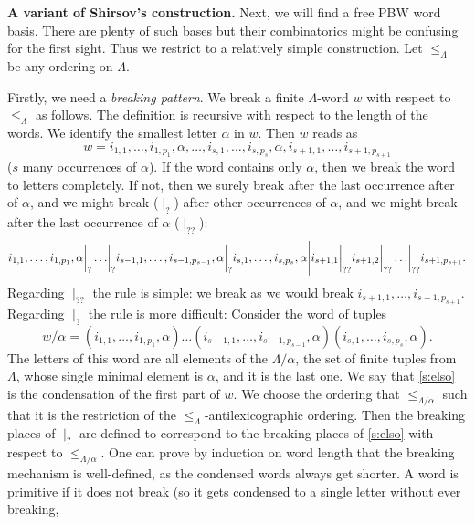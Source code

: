 \documentclass[11pt,a4paper]{amsart}
\newcommand{\plabel}[1]{ \label{#1}}
\newcommand{\plabel}[1]{ \label{#1}\rlap{\smash{${}^{^{[#1]}}$}}}
\newcommand{\plabel}[1]{ \label{#1}}
\theoremstyle{definition}
\theoremstyle{plain}
\begin{document}
\textbf{A variant of Shirsov's construction.}
Next, we will find a free PBW word basis.
There are plenty of such bases but their combinatorics might be confusing for the first sight.
Thus we restrict to a relatively simple construction.
Let $\leq_\Lambda$ be any ordering on $\Lambda$.

Firstly, we need a \textit{breaking pattern}.
We break a finite $\Lambda$-word $w$ with respect to $\leq_\Lambda$ as follows.
The definition is recursive with respect to the length of the words.
We identify the smallest letter $\alpha$ in $w$.
Then $w$ reads as
\begin{equation}
w=i_{1,1},\ldots, i_{1,p_1},\alpha,\ldots, i_{s,1},\ldots ,i_{s,p_s}, \alpha, i_{s+1,1},\ldots, i_{s+1,p_{s+1}}
\end{equation}
 ($s$ many occurrences of $\alpha$).
If the word contains only $\alpha$, then we break the word to letters completely.
If not, then we surely break after the last occurrence after of $\alpha$, and we might break ($\mid_{?}$)
 after other occurrences of $\alpha$, and we might break after the last occurrence of $\alpha$ ($\mid_{??}$):
\begin{equation}
 i_{1,1},\ldots, i_{1,p_1},\alpha\biggr|_?\ldots\biggr|_? i_{s-1,1},\ldots ,i_{s-1,p_{s-1}},
 \alpha\biggr|_?i_{s,1},\ldots ,i_{s,p_s}, \alpha\Biggr| i_{s+1,1}\biggr|_{??}i_{s+1,2}\biggr|_{??}\ldots \biggr|_{??}i_{s+1,p_{s+1}}.
 \notag
\end{equation}
Regarding  $\mid_{??}$ the rule is simple: we break as we would break $i_{s+1,1},\ldots, i_{s+1,p_{s+1}}$.
Regarding  $\mid_?$ the rule is more difficult: Consider the word of tuples
\begin{equation}
w/\alpha=(i_{1,1},\ldots, i_{1,p_1},\alpha) \ldots  (i_{s-1,1},\ldots ,i_{s-1,p_{s-1}},\alpha) (i_{s,1},\ldots ,i_{s,p_s},\alpha).
\plabel{s:elso}\end{equation}
The letters of this word are all elements of the $\Lambda/\alpha$,
 the set of finite tuples from $\Lambda$, whose single minimal element is $\alpha$, and it is the last one.
We say that \eqref{s:elso} is the condensation of the first part of $w$.
We  choose the ordering that $\leq_{\Lambda/\alpha}$
 such that it is the restriction of the $\leq_\Lambda$-antilexicographic ordering.
Then the breaking places of $\mid_?$ are defined to correspond to the breaking places of
 \eqref{s:elso} with respect to $\leq_{\Lambda/\alpha}$.
One can prove by induction on word length that the breaking mechanism is well-defined, as the condensed words always get shorter.
A word is primitive if it does not break (so it gets condensed to a single letter without ever breaking,
\end{document}

